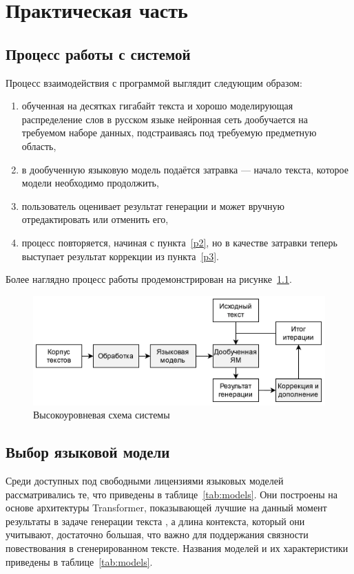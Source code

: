 \chapter{Практическая часть}

\section{Процесс работы с системой}

Процесс взаимодействия с программой выглядит следующим образом:
\begin{enumerate}
    \item обученная на десятках гигабайт текста и хорошо моделирующая распределение слов в русском языке нейронная сеть дообучается на требуемом наборе данных, подстраиваясь под требуемую предметную область,
    \item \label{p2} в дообученную языковую модель подаётся затравка --- начало текста, которое модели необходимо продолжить,
    \item \label{p3} пользователь оценивает результат генерации и может вручную отредактировать или отменить его,
    \item процесс повторяется, начиная с пункта \ref*{p2}, но в качестве затравки теперь выступает результат коррекции из пункта \ref*{p3}.
\end{enumerate}

Более наглядно процесс работы продемонстрирован на рисунке \ref*{fig:pipeline}.

\begin{figure}[h]
    \centering
    \includegraphics[width=\textwidth]{../inc/images/pipeline.png}
    \caption{Высокоуровневая схема системы}
    \label{fig:pipeline}
\end{figure}

\section{Выбор языковой модели}

Среди доступных под свободными лицензиями языковых моделей рассматривались те, что приведены в таблице \ref*{tab:models}. Они построены на основе архитектуры Transformer, показывающей лучшие на данный момент результаты в задаче генерации текста \cite{art:models_review}, а длина контекста, который они учитывают, достаточно большая, что важно для поддержания связности повествования в сгенерированном тексте. Названия моделей и их характеристики приведены в таблице \ref*{tab:models}.

